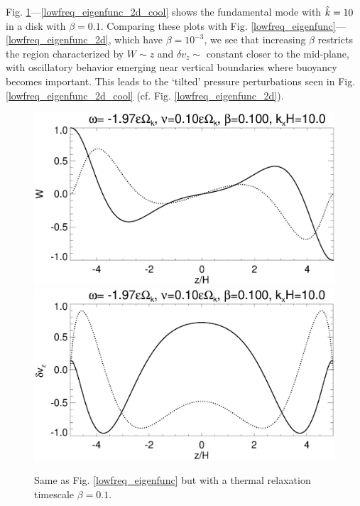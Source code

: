 Fig. \ref{lowfreq_eigenfunc_cool}---\ref{lowfreq_eigenfunc_2d_cool}
shows the fundamental mode with $\hat{k}=10$ in a disk with 
$\beta=0.1$. Comparing these plots with
Fig. \ref{lowfreq_eigenfunc}---\ref{lowfreq_eigenfunc_2d}, which have
$\beta=10^{-3}$, we see that increasing $\beta$ restricts the region 
characterized by $W\sim z$ and $\delta v_z\sim$ constant closer to the
mid-plane, with oscillatory behavior emerging near vertical boundaries
where buoyancy becomes important. This leads to the `tilted' pressure
perturbations seen in Fig. \ref{lowfreq_eigenfunc_2d_cool} 
(cf. Fig. \ref{lowfreq_eigenfunc_2d}). %

\begin{figure}
  \includegraphics[width=\linewidth,clip=true,trim=0cm 1.75cm 0cm
  0cm]{figures/eigenvectorW_beta0d1} 
  \includegraphics[width=\linewidth,clip=true,trim=0cm 0cm 0cm
  1cm]{figures/eigenvectorvz_beta0d1}
  \caption{Same as Fig. \ref{lowfreq_eigenfunc} but with a
    thermal relaxation timescale $\beta=0.1$. 
    \label{lowfreq_eigenfunc_cool}
  }
\end{figure}

